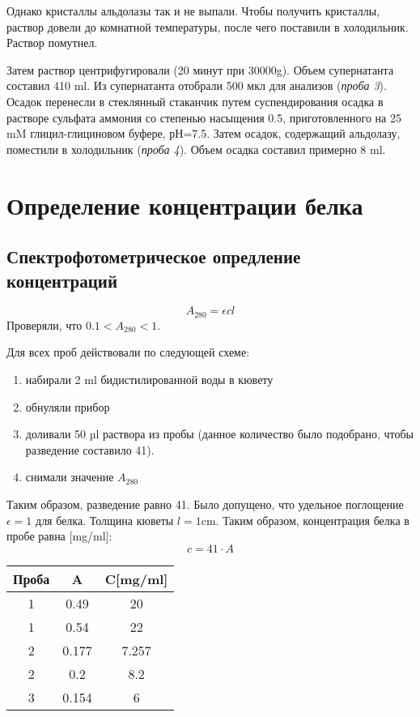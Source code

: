 Однако кристаллы альдолазы так и не выпали.
Чтобы получить кристаллы, раствор довели до комнатной температуры,
после чего поставили в холодильник. Раствор помутнел.

Затем раствор центрифугировали (20 минут при 30000g).
Объем супернатанта составил 410 ml.
Из супернатанта отобрали 500 мкл для анализов (\emph{проба 3}).
Осадок перенесли в стеклянный стаканчик путем суспендирования осадка
в растворе сульфата аммония со степенью насыщения 0.5,
приготовленного на 25 mM глицил-глициновом буфере, рН=7.5.
Затем осадок, содержащий альдолазу, поместили в холодильник (\emph{проба 4}).
Объем осадка составил примерно 8 ml.

\section{Определение концентрации белка}

\subsection{Спектрофотометрическое опредление концентраций}
$$ A_{280} = \epsilon c l $$
Проверяли, что $ 0.1 < A_{280} < 1 $.

Для всех проб действовали по следующей схеме:
\begin{enumerate}
\item набирали 2 ml бидистилированной воды в кювету
\item обнуляли прибор
\item доливали 50 µl раствора из пробы
    (данное количество было подобрано, чтобы разведение составило 41).
\item снимали значение $A_{280}$
\end{enumerate}
Таким образом, разведение равно 41.
Было допущено, что удельное поглощение $\epsilon = 1$ для белка.
Толщина кюветы $l = 1 \text{cm}$.
Таким образом, концентрация белка в пробе равна [mg/ml]:
$$ c=41 \cdot A $$

\begin{tabular}{|c|c|c|}
\hline
Проба & A & C[mg/ml] \\
\hline
1 & 0.49 & 20 \\
1 & 0.54 & 22 \\
\hline
2 & 0.177 & 7.257 \\
2 & 0.2 & 8.2 \\
\hline
3 & 0.154 & 6 \\
\hline
\end{tabular}

